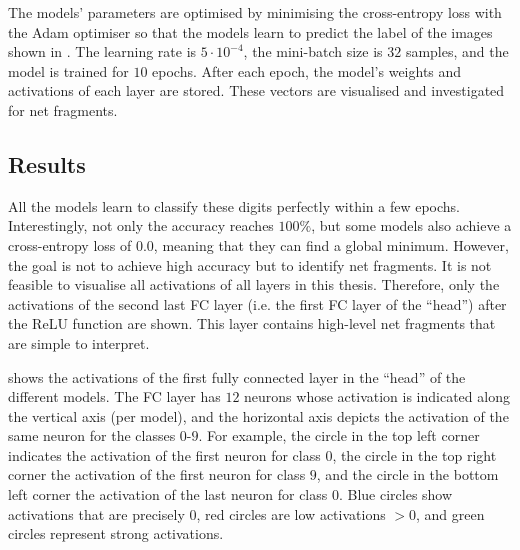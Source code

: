 The models' parameters are optimised by minimising the cross-entropy loss with the Adam optimiser  so that the models learn to predict the label of the images shown in .
The learning rate is $5 \cdot 10^{-4}$, the mini-batch size is $32$ samples, and the model is trained for $10$ epochs.
After each epoch, the model's weights and activations of each layer are stored.
These vectors are visualised and investigated for net fragments.



\subsection{Results}
All the models learn to classify these digits perfectly within a few epochs.
Interestingly, not only the accuracy reaches $100\%$, but some models also achieve a cross-entropy loss of $0.0$, meaning that they can find a global minimum.
However, the goal is not to achieve high accuracy but to identify net fragments.
It is not feasible to visualise all activations of all layers in this thesis.
Therefore, only the activations of the second last FC layer (i.e. the first FC layer of the ``head'') after the ReLU function are shown.
This layer contains high-level net fragments that are simple to interpret.

 shows the activations of the first fully connected layer in the ``head'' of the different models.
The FC layer has $12$ neurons whose activation is indicated along the vertical axis (per model), and the horizontal axis depicts the activation of the same neuron for the classes $0$-$9$.
For example, the circle in the top left corner indicates the activation of the first neuron for class $0$, the circle in the top right corner the activation of the first neuron for class $9$, and the circle in the bottom left corner the activation of the last neuron for class $0$.
Blue circles show activations that are precisely $0$, red circles are low activations $>0$, and green circles represent strong activations.

